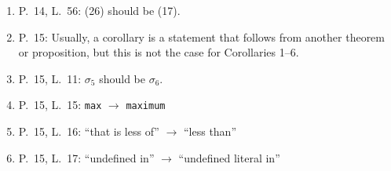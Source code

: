 \documentclass[11pt]{article}
\theoremstyle{definition}
\begin{document}
\begin{enumerate}
    \item P.~14, L.~56: (26) should be (17).

    \item P.~15: Usually, a corollary is a statement that follows from another theorem or proposition, but this is not the case for Corollaries 1--6.
    \item P.~15, L.~11: $\sigma_5$ should be $\sigma_6$.
    \item P.~15, L.~15: \texttt{max} $\rightarrow$ \texttt{maximum}

    \item P.~15, L.~16: ``that is less of'' $\rightarrow$ ``less than''

    \item P.~15, L.~17: ``undefined in'' $\rightarrow$ ``undefined literal in''

    

\end{enumerate}
\end{document}
